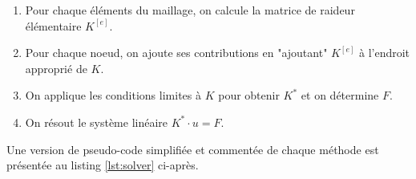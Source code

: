 \documentclass{article}
\begin{document}
\begin{enumerate}
    \item Pour chaque éléments du maillage,
    on calcule la matrice de raideur élémentaire $K^{[e]}$.
    \item Pour chaque noeud, on ajoute ses contributions en "ajoutant" $K^{[e]}$ à l'endroit approprié de $K$.
    \item On applique les conditions limites à $K$ pour obtenir $K^*$ et on détermine $F$.
    \item On résout le système linéaire $K^* \cdot u = F$.
\end{enumerate}

Une version de pseudo-code simplifiée et commentée de chaque méthode 
est présentée au listing \ref{lst:solver} ci-après.

\newpage
\end{document}
